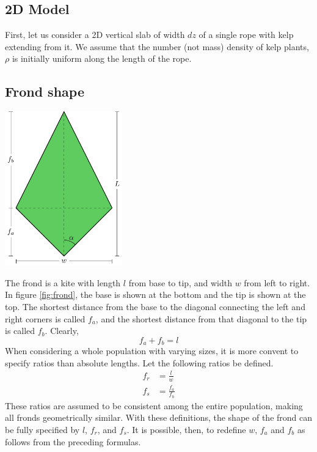 \documentclass[10pt]{article}
\newenvironment{mcfig}
	{\par\medskip\noindent\minipage{\linewidth}}
	{\endminipage\par\medskip}
\begin{document}
\begin{multicols}{2}
\section{2D Model}
First, let us consider a 2D vertical slab of width $dz$ of a single rope with kelp extending from it.
We assume that the number (not mass) density of kelp plants, $\rho$ is initially uniform along the length of the rope.

\subsection{Frond shape}
\label{sec:shape}

\begin{mcfig}
	\centering
	\includegraphics[width=2in]{frond}
	\label{fig:frond}
\end{mcfig}

The frond is a kite with length $l$ from base to tip, and width $w$ from left to right.
 In figure \ref{fig:frond}, the base is shown at the bottom and the tip is shown at the top.
 The shortest distance from the base to the diagonal connecting the left and right corners is called $f_a$, and the shortest distance from that diagonal to the tip is called $f_b$.
 Clearly,
 \begin{equation}
	 f_a + f_b = l
 \end{equation}
When considering a whole population with varying sizes, it is more convent to specify ratios than absolute lengths.
Let the following ratios be defined.
\begin{align}
	f_r &= \frac{l}{w} \\
	f_s &= \frac{f_a}{f_b}
\end{align}
These ratios are assumed to be consistent among the entire population, making all fronds geometrically similar.
With these definitions, the shape of the frond can be fully specified by $l$, $f_r$, and $f_s$.
It is possible, then, to redefine $w$, $f_a$ and $f_b$ as follows from the preceding formulas.


\end{multicols}
\end{document}
